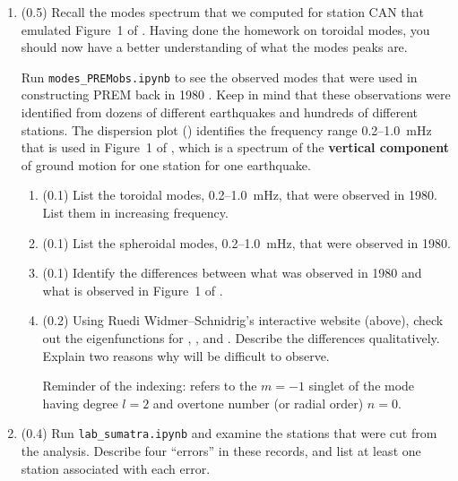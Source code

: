 \documentclass[11pt,titlepage,fleqn]{article}
\begin{document}
\begin{enumerate}
\item (0.5) Recall the modes spectrum that we computed for station CAN that emulated Figure~1 of \citet{Park2005}. Having done the homework on toroidal modes, you should now have a better understanding of what the modes peaks are.

Run \verb+modes_PREMobs.ipynb+ to see the observed modes that were used in constructing PREM back in 1980 \citep{PREM}. Keep in mind that these observations were identified from dozens of different earthquakes and hundreds of different stations.
The dispersion plot () identifies the frequency range 0.2--1.0~mHz that is used in Figure~1 of \citet{Park2005}, which is a spectrum of the {\bf vertical component} of ground motion for one station for one earthquake.
%
\begin{enumerate}
\item (0.1) List the toroidal modes, 0.2--1.0~mHz, that were observed in 1980. \\
List them in increasing frequency.
\item (0.1) List the spheroidal modes, 0.2--1.0~mHz, that were observed in 1980.
\item (0.1) Identify the differences between what was observed in 1980 and what is observed in Figure~1 of \citet{Park2005}.
\item (0.2) Using Ruedi Widmer--Schnidrig's interactive website (above), check out the eigenfunctions for , , and . Describe the differences qualitatively. Explain two reasons why  will be difficult to observe.

Reminder of the indexing:  refers to the $m=-1$ singlet of the mode having degree $l=2$ and overtone number (or radial order) $n=0$.
\end{enumerate}


\item (0.4) Run \verb+lab_sumatra.ipynb+ and examine the stations that were cut from the analysis. Describe four ``errors'' in these records, and list at least one station associated with each error.


\end{enumerate}
\end{document}
